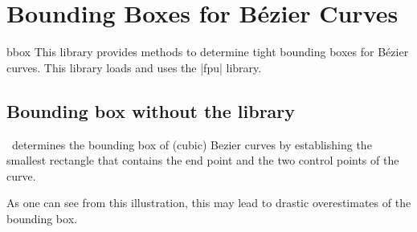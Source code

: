 %
%
%
%

\section{Bounding Boxes for B\'ezier Curves}


\begin{pgflibrary}{bbox}
    This library provides methods to determine tight bounding boxes for
    B\'ezier curves. This library loads and uses the
	|fpu| library.
\end{pgflibrary}

\subsection{Bounding box without the library}

\tikzname\ determines the bounding box of (cubic) Bezier curves by establishing the
smallest rectangle that contains the end point and the two control points of the
curve.

\begin{codeexample}[width=5cm]
\end{codeexample}

As one can see from this illustration, this may lead to drastic overestimates of
the bounding box.

